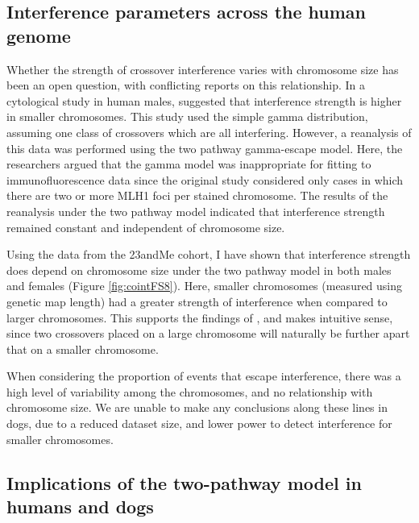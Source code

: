 \subsection{Interference parameters across the human genome}

Whether the strength of crossover interference varies with chromosome size has been an open question, with conflicting reports on this relationship.
In a cytological study in human males, \citet{Lian2008} suggested that interference strength is higher in smaller chromosomes. %
This study used the simple gamma distribution, assuming one class of crossovers which are all interfering.
However, a reanalysis of this data was performed using the two pathway gamma-escape model\cite{Housworth2009}.
Here, the researchers argued that the gamma model was inappropriate for fitting to immunofluorescence data since the original study considered only cases in which there are two or more MLH1 foci per stained chromosome.
The results of the reanalysis under the two pathway model indicated that interference strength remained constant and independent of chromosome size\cite{Housworth2009}.

Using the data from the 23andMe cohort, I have shown that interference strength does depend on chromosome size under the two pathway model in both males and females (Figure \ref{fig:cointFS8}).
Here, smaller chromosomes (measured using genetic map length) had a greater strength of interference when compared to larger chromosomes.
This supports the findings of \citet{Lian2008}, and
makes intuitive sense, since two crossovers placed on a large chromosome will naturally be further apart that on a smaller chromosome.

When considering the proportion of events that escape interference, there was a high level of variability among the chromosomes, and no relationship with chromosome size.
We are unable to make any conclusions along these lines in dogs, due to a reduced dataset size, and lower power to detect interference for smaller chromosomes.


\subsection{Implications of the two-pathway model in humans and dogs}

